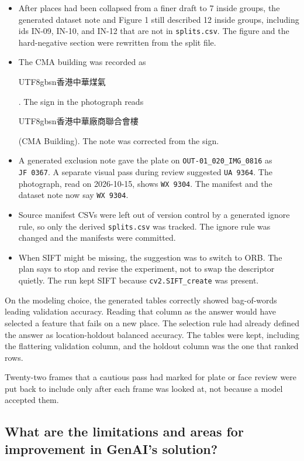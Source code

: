 \documentclass[11pt,a4paper]{article}
\providecommand{\tightlist}{%
  \setlength{\itemsep}{0pt}\setlength{\parskip}{0pt}}
\begin{document}
\begin{itemize}
\tightlist
\item
  After places had been collapsed from a finer draft to 7 inside groups, the generated dataset note and Figure 1 still described 12 inside groups, including ids IN-09, IN-10, and IN-12 that are not in \texttt{splits.csv}. The figure and the hard-negative section were rewritten from the split file.
\item
  The CMA building was recorded as \begin{CJK*}{UTF8}{gbsn}香港中華煤氣\end{CJK*}. The sign in the photograph reads \begin{CJK*}{UTF8}{gbsn}香港中華廠商聯合會樓\end{CJK*} (CMA Building). The note was corrected from the sign.
\item
  A generated exclusion note gave the plate on \texttt{OUT-\allowbreak{}01\_\allowbreak{}020\_\allowbreak{}IMG\_\allowbreak{}0816} as \texttt{JF\ 0367}. A separate visual pass during review suggested \texttt{UA\ 9364}. The photograph, read on 2026-10-15, shows \texttt{WX\ 9304}. The manifest and the dataset note now say \texttt{WX\ 9304}.
\item
  Source manifest CSVs were left out of version control by a generated ignore rule, so only the derived \texttt{splits.csv} was tracked. The ignore rule was changed and the manifests were committed.
\item
  When SIFT might be missing, the suggestion was to switch to ORB. The plan says to stop and revise the experiment, not to swap the descriptor quietly. The run kept SIFT because \texttt{cv2.SIFT\_\allowbreak{}create} was present.
\end{itemize}

On the modeling choice, the generated tables correctly showed bag-of-words leading validation accuracy. Reading that column as the answer would have selected a feature that fails on a new place. The selection rule had already defined the answer as location-holdout balanced accuracy. The tables were kept, including the flattering validation column, and the holdout column was the one that ranked rows.

Twenty-two frames that a cautious pass had marked for plate or face review were put back to include only after each frame was looked at, not because a model accepted them.

\subsection{What are the limitations and areas for improvement in GenAI's solution?}\label{what-are-the-limitations-and-areas-for-improvement-in-genais-solution}
\end{document}
